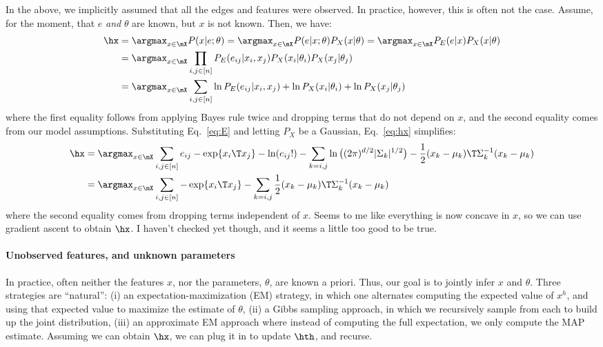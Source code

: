 In the above, we implicitly assumed that all the edges and features were observed.  In practice, however, this is often not the case.  Assume, for the moment, that $e$ \emph{and} $\theta$ are known, but $x$ is not known.  Then, we have:
\begin{align} \label{eq:hx}
	\hx &= \argmax_{x \in \mX} P(x|e;\theta) = \argmax_{x \in \mX} P(e|x;\theta) P_X(x|\theta) = \argmax_{x \in \mX} 
	 P_E(e|x) P_X(x|\theta) \nonumber \\
	&= \argmax_{x \in \mX} \prod_{i,j \in [n]} P_E(e_{ij}|x_i,x_j) P_X(x_i | \theta_i) P_X(x_j|\theta_j) \nonumber \\
	&= \argmax_{x \in \mX} \sum_{i,j \in [n]} \ln P_E(e_{ij}|x_i,x_j) + \ln P_X(x_i | \theta_i) + \ln  P_X(x_j|\theta_j) 
\end{align}
where the first equality follows from applying Bayes rule twice and dropping terms that do not depend on $x$, and the second equality comes from our model assumptions.  Substituting Eq.~\eqref{eq:E} and letting $P_X$ be a Gaussian, Eq.~\eqref{eq:hx} simplifies:
\begin{align} \label{eq:hx2}
	\hx &= \argmax_{x \in \mX} \sum_{i,j \in [n]} e_{ij} - \exp\{x_i\T x_j\} - \ln (e_{ij}!) - \sum_{k=i,j} \ln \big((2\pi)^{d/2} |\Sigma_k|^{1/2}\big) - \frac{1}{2} (x_k-\mu_k)\T \Sigma_k^{-1} (x_k-\mu_k) \nonumber \\
	&= \argmax_{x \in \mX} \sum_{i,j \in [n]} -\exp\{x_i\T x_j\} - \sum_{k=i,j}\frac{1}{2} (x_k-\mu_k)\T \Sigma_k^{-1} (x_k-\mu_k)
\end{align}
where the second equality comes from dropping terms independent of $x$.  Seems to me like everything is now concave in $x$, so we can use gradient ascent to obtain $\hx$.  I haven't checked yet though, and it seems a little too good to be true.




\paragraph{Unobserved features, and unknown parameters}

In practice, often neither the features $x$, nor the parameters, $\theta$, are known a priori.  Thus, our goal is to jointly infer $x$ and $\theta$.  Three strategies are ``natural'': (i) an expectation-maximization (EM) strategy, in which one alternates computing the expected value of $x^h$, and using that expected value to maximize the estimate of $\theta$, (ii) a Gibbs sampling approach, in which we recursively sample from each to build up the joint distribution, (iii) an approximate EM approach where instead of computing the full expectation, we only compute the MAP estimate.  Assuming we can obtain $\hx$, we can plug it in to update $\hth$, and recurse.

